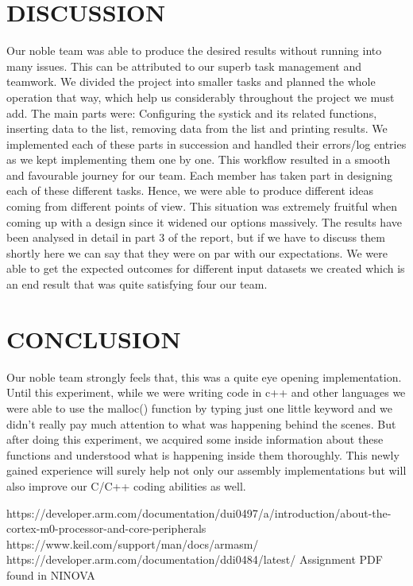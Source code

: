 \documentclass[pdftex,12pt,a4paper]{article}
\begin{document}
\section{DISCUSSION}
Our noble team was able to produce the desired results without running into many issues. This can be attributed to our superb task management and teamwork. We divided the project into smaller tasks and planned the whole operation that way, which help us considerably throughout the project we must add. The main parts were: Configuring the systick and its related functions, inserting data to the list, removing data from the list and printing results. We implemented each of these parts in succession and handled their errors/log entries as we kept implementing them one by one. This workflow resulted in a smooth and favourable journey for our team. Each member has taken part in designing each of these different tasks. Hence, we were able to produce different ideas coming from different points of view. This situation was extremely fruitful when coming up with a design since it widened our options massively.  
\newline  The results have been analysed in detail in part 3 of the report, but if we have to discuss them shortly here we can say that they were on par with our expectations. We were able to get the expected outcomes for different input datasets we created which is an end result that was quite satisfying four our team.

\section{CONCLUSION}
Our noble team strongly feels that, this was a quite eye opening implementation. Until this experiment, while we were writing code in c++ and other languages we were able to use the malloc() function by typing just one little keyword and we didn't really pay much attention to what was happening behind the scenes. But after doing this experiment, we acquired some inside information about these functions and understood what is happening inside them thoroughly. This newly gained experience will surely help not only our assembly implementations but will also improve our C/C++ coding abilities as well.

\newpage
{}



\newline https://developer.arm.com/documentation/dui0497/a/introduction/about-the-cortex-m0-processor-and-core-peripherals
\newline https://www.keil.com/support/man/docs/armasm/
\newline https://developer.arm.com/documentation/ddi0484/latest/
\newline Assignment PDF found in NINOVA
\end{document}
